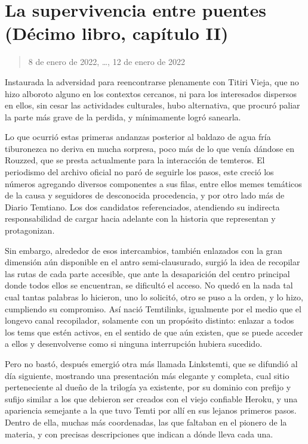 \documentclass[
]{book}
\begin{document}
\hypertarget{la-supervivencia-entre-puentes-duxe9cimo-libro-capuxedtulo-ii}{%
\section{La supervivencia entre puentes (Décimo libro, capítulo II)}\label{la-supervivencia-entre-puentes-duxe9cimo-libro-capuxedtulo-ii}}

\begin{quote}
8 de enero de 2022, \ldots, 12 de enero de 2022
\end{quote}

Instaurada la adversidad para reencontrarse plenamente con Titiri Vieja, que no hizo alboroto alguno en los contextos cercanos, ni para los interesados dispersos en ellos, sin cesar las actividades culturales, hubo alternativa, que procuró paliar la parte más grave de la perdida, y mínimamente logró sanearla.

Lo que ocurrió estas primeras andanzas posterior al baldazo de agua fría tiburonezca no deriva en mucha sorpresa, poco más de lo que venía dándose en Rouzzed, que se presta actualmente para la interacción de temteros. El periodismo del archivo oficial no paró de seguirle los pasos, este creció los números agregando diversos componentes a sus filas, entre ellos memes temáticos de la causa y seguidores de desconocida procedencia, y por otro lado más de Diario Temtiano. Los dos candidatos referenciados, atendiendo su indirecta responsabilidad de cargar hacia adelante con la historia que representan y protagonizan.

Sin embargo, alrededor de esos intercambios, también enlazados con la gran dimensión aún disponible en el antro semi-clausurado, surgió la idea de recopilar las rutas de cada parte accesible, que ante la desaparición del centro principal donde todos ellos se encuentran, se dificultó el acceso. No quedó en la nada tal cual tantas palabras lo hicieron, uno lo solicitó, otro se puso a la orden, y lo hizo, cumpliendo su compromiso. Así nació Temtilinks, igualmente por el medio que el longevo canal recopilador, solamente con un propósito distinto: enlazar a todos los tems que estén activos, en el sentido de que aún existen, que se puede acceder a ellos y desenvolverse como si ninguna interrupción hubiera sucedido.

Pero no bastó, después emergió otra más llamada Linkstemti, que se difundió al día siguiente, mostrando una presentación más elegante y completa, cual sitio perteneciente al dueño de la trilogía ya existente, por su dominio con prefijo y sufijo similar a los que debieron ser creados con el viejo confiable Heroku, y una apariencia semejante a la que tuvo Temti por allí en sus lejanos primeros pasos. Dentro de ella, muchas más coordenadas, las que faltaban en el pionero de la materia, y con precisas descripciones que indican a dónde lleva cada una.
\end{document}
